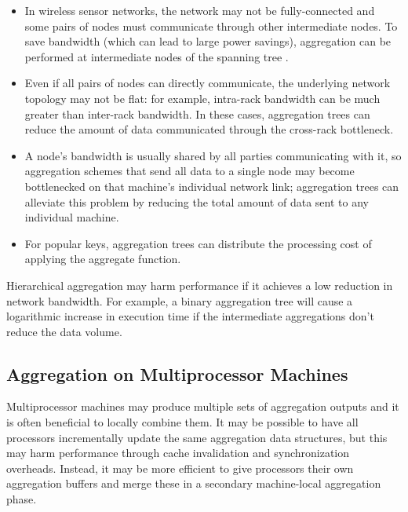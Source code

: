 \documentclass[12pt]{article}
\begin{document}
\begin{itemize}
    \item In wireless sensor networks, the network may not be fully-connected
    and some pairs of nodes must communicate through other intermediate nodes.
    To save bandwidth (which can lead to large power savings), aggregation can
    be performed at intermediate nodes of the spanning tree \cite{tag}.

    \item Even if all pairs of nodes can directly communicate, the underlying
    network topology may not be flat: for example, intra-rack bandwidth can be
    much greater than inter-rack bandwidth.  In these cases, aggregation trees
    can reduce the amount of data communicated through the cross-rack
    bottleneck.

    \item A node's bandwidth is usually shared by all parties communicating
    with it, so aggregation schemes that send all data to a single node may
    become bottlenecked on that machine's individual network link; aggregation
    trees can alleviate this problem by reducing the total amount of data sent
    to any individual machine.

    \item For popular keys, aggregation trees can distribute the processing
    cost of applying the aggregate function.

\end{itemize}

Hierarchical aggregation may harm performance if it achieves a low reduction
in network bandwidth. For example, a binary aggregation tree will cause
a logarithmic increase in execution time if the intermediate aggregations
don't reduce the data volume.

\subsection{Aggregation on Multiprocessor Machines}

Multiprocessor machines may produce multiple sets of aggregation outputs and
it is often beneficial to locally combine them.  It may be possible to have
all processors incrementally update the same aggregation data structures, but
this may harm performance through cache invalidation and synchronization
overheads.  Instead, it may be more efficient to give processors their own
aggregation buffers and merge these in a secondary machine-local aggregation
phase.
\end{document}
